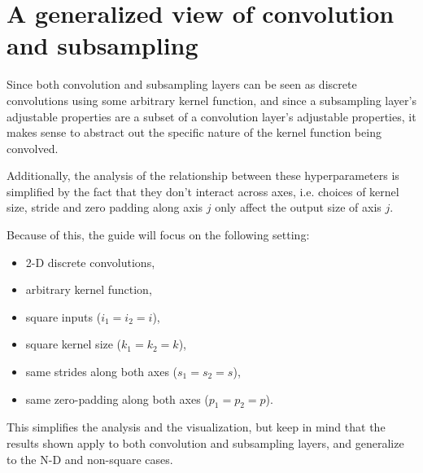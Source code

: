 \documentclass{report}
\begin{document}
\section{A generalized view of convolution and subsampling}

Since both convolution and subsampling layers can be seen as discrete
convolutions using some arbitrary kernel function, and since a subsampling
layer's adjustable properties are a subset of a convolution layer's adjustable
properties, it makes sense to abstract out the specific nature of the kernel
function being convolved.

Additionally, the analysis of the relationship between these hyperparameters is
simplified by the fact that they don't interact across axes, i.e. choices of
kernel size, stride and zero padding along axis $j$ only affect the output size
of axis $j$.

Because of this, the guide will focus on the following setting:

\begin{itemize}
    \item 2-D discrete convolutions,
    \item arbitrary kernel function,
    \item square inputs ($i_1 = i_2 = i$),
    \item square kernel size ($k_1 = k_2 = k$),
    \item same strides along both axes ($s_1 = s_2 = s$),
    \item same zero-padding along both axes ($p_1 = p_2 = p$).
\end{itemize}

This simplifies the analysis and the visualization, but keep in mind that the
results shown apply to both convolution and subsampling layers, and generalize
to the N-D and non-square cases.
\end{document}

